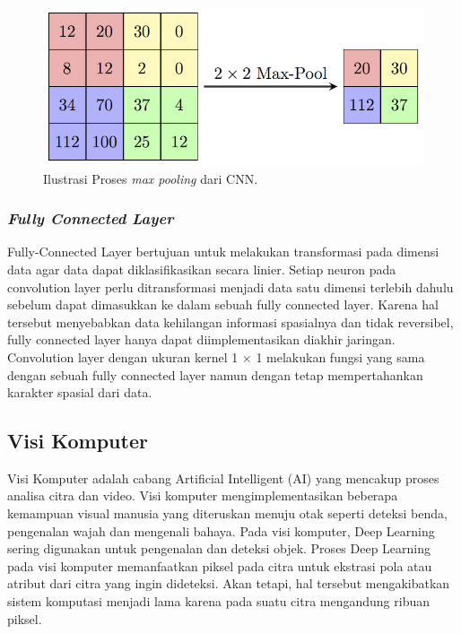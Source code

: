 \begin{figure}[ht]
  \centering

  \includegraphics[scale=2]{gambar/MaxpoolSample.png}

  \caption{Ilustrasi Proses \emph{max pooling} dari CNN.}
  \label{fig:convolutional-neural-network}
\end{figure}


\subsubsection{\emph{Fully Connected Layer}}
\label{subsec:fullyconnectedlayer}

Fully-Connected Layer bertujuan untuk melakukan transformasi pada dimensi data agar data dapat diklasifikasikan secara linier. Setiap neuron pada convolution layer perlu ditransformasi menjadi data satu dimensi terlebih dahulu sebelum dapat dimasukkan
ke dalam sebuah fully connected layer. Karena hal tersebut menyebabkan data kehilangan informasi spasialnya dan tidak reversibel,
fully connected layer hanya dapat diimplementasikan diakhir jaringan. Convolution layer dengan ukuran kernel 1 × 1 melakukan fungsi
yang sama dengan sebuah fully connected layer namun dengan tetap
mempertahankan karakter spasial dari data.


\subsection{Visi Komputer}
\label{sec:viskom}

Visi Komputer adalah cabang Artificial Intelligent (AI) yang mencakup proses analisa
citra dan video. Visi komputer mengimplementasikan beberapa kemampuan visual manusia
yang diteruskan menuju otak seperti deteksi benda, pengenalan wajah dan mengenali
bahaya. Pada visi komputer, Deep Learning sering digunakan untuk pengenalan dan
deteksi objek. Proses Deep Learning pada visi komputer memanfaatkan piksel pada citra
untuk ekstrasi pola atau atribut dari citra yang ingin dideteksi. Akan tetapi, hal tersebut
mengakibatkan sistem komputasi menjadi lama karena pada suatu citra mengandung
ribuan piksel.

